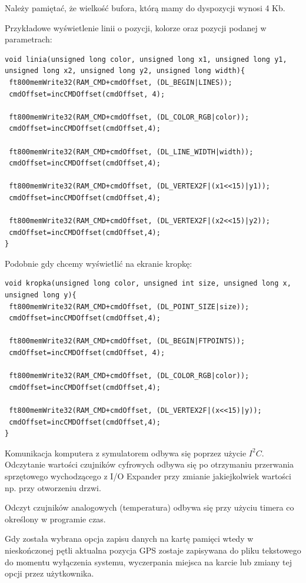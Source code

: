 \documentclass{xmgr}
\begin{document}
Należy pamiętać, że wielkość bufora, którą mamy do dyspozycji wynosi 4 Kb. 

Przykładowe wyświetlenie linii o pozycji, kolorze oraz pozycji podanej w parametrach:
\begin{lstlisting}[label=bot-dirs-alg,caption=Narysowanie linii na ekranie]
void linia(unsigned long color, unsigned long x1, unsigned long y1, 
unsigned long x2, unsigned long y2, unsigned long width){
 ft800memWrite32(RAM_CMD+cmdOffset, (DL_BEGIN|LINES));
 cmdOffset=incCMDOffset(cmdOffset, 4);
 
 ft800memWrite32(RAM_CMD+cmdOffset, (DL_COLOR_RGB|color));
 cmdOffset=incCMDOffset(cmdOffset,4);

 ft800memWrite32(RAM_CMD+cmdOffset, (DL_LINE_WIDTH|width));
 cmdOffset=incCMDOffset(cmdOffset,4);

 ft800memWrite32(RAM_CMD+cmdOffset, (DL_VERTEX2F|(x1<<15)|y1));
 cmdOffset=incCMDOffset(cmdOffset,4);
  
 ft800memWrite32(RAM_CMD+cmdOffset, (DL_VERTEX2F|(x2<<15)|y2));
 cmdOffset=incCMDOffset(cmdOffset,4);	
}
\end{lstlisting}

Podobnie gdy chcemy wyświetlić na ekranie kropkę:
\begin{lstlisting}[label=bot-dirs-alg,caption=Narysowanie kropki na ekranie]
void kropka(unsigned long color, unsigned int size, unsigned long x, 
unsigned long y){ 
 ft800memWrite32(RAM_CMD+cmdOffset, (DL_POINT_SIZE|size));
 cmdOffset=incCMDOffset(cmdOffset,4);

 ft800memWrite32(RAM_CMD+cmdOffset, (DL_BEGIN|FTPOINTS));
 cmdOffset=incCMDOffset(cmdOffset, 4);

 ft800memWrite32(RAM_CMD+cmdOffset, (DL_COLOR_RGB|color));
 cmdOffset=incCMDOffset(cmdOffset,4);
 
 ft800memWrite32(RAM_CMD+cmdOffset, (DL_VERTEX2F|(x<<15)|y));
 cmdOffset=incCMDOffset(cmdOffset,4);
}
\end{lstlisting}

Komunikacja komputera z symulatorem odbywa się poprzez użycie $I^2C$. Odczytanie wartości czujników cyfrowych odbywa się po otrzymaniu przerwania sprzętowego wychodzącego z I/O Expander przy zmianie jakiejkolwiek wartości np. przy otworzeniu drzwi. 

Odczyt czujników analogowych (temperatura) odbywa się przy użyciu timera co określony w programie czas. 

Gdy została wybrana opcja zapisu danych na kartę pamięci wtedy w nieskończonej pętli aktualna pozycja GPS zostaje zapisywana do pliku tekstowego do momentu wyłączenia systemu, wyczerpania miejsca na karcie lub zmiany tej opcji przez użytkownika.
\end{document}
